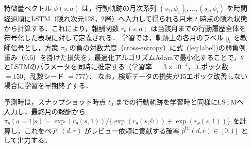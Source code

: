 \documentclass[submit,noauthor,ses,dvipdfmx]{ipsj}
\begin{document}
特徴量ベクトル $\phi(s,a)$ は，行動軌跡の月次系列 $(s_1, \phi_1), \ldots, (s_t, \phi_t)$ を時間経過順にLSTM（隠れ次元128，2層）\cite{hochreiter_lstm}へ入力して得られる月末 $t$ 時点の隠れ状態から計算する．これにより，報酬関数 $r_\theta(s,a)$ は当該月までの行動履歴全体を符号化した表現に対して定義される．
学習では，軌跡上の各月のラベル $y_t$ を教師信号とし，方策 $\pi_\theta$ の負の対数尤度（cross-entropy）に式~(\ref{eq:label})の弱負例重み（$0.5$）を掛けた損失を，最適化アルゴリズムAdam\cite{adam}で最小化することで，$\theta$ とLSTMのパラメータを同時に推定する（学習率 $= 3\times10^{-4}$，エポック数 $= 150$，乱数シード $= 777$）．
なお，検証データの損失が15エポック改善しない場合に学習を早期終了する．

予測時は，スナップショット時点 $t_0$ までの行動軌跡を学習時と同様にLSTMへ入力し，最終月の報酬から
$\pi_\theta(a{=}1|s) = \exp(r_\theta(s,1)) / \{\exp(r_\theta(s,0)) + \exp(r_\theta(s,1))\}$
を計算し，これをペア $(d, r)$ がレビュー依頼に貢献する確率 $\hat{p}^{\mathrm{irl}}(d, r) \in [0,1]$ として出力する．













\end{document}
